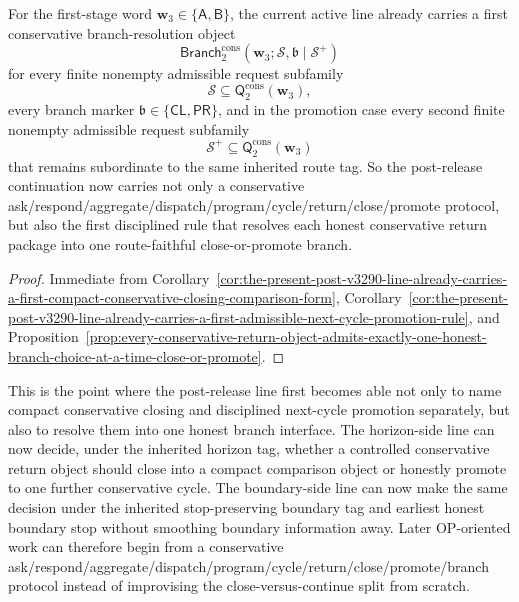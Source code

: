 \begin{corollary}
\label{cor:the-present-post-v3290-line-already-carries-a-first-conservative-branch-resolution-rule}
For the first-stage word \(\mathbf w_3\in\{\mathsf A,\mathsf B\}\), the current active line already carries a first conservative branch-resolution object
\[
  \mathsf{Branch}^{\mathrm{cons}}_{2}(\mathbf w_3;\mathcal S,\mathfrak b\mid\mathcal S^{+})
\]
for every finite nonempty admissible request subfamily
\[
  \mathcal S\subseteq \mathsf{Q}^{\mathrm{cons}}_{2}(\mathbf w_3),
\]
every branch marker \(\mathfrak b\in\{\mathsf{CL},\mathsf{PR}\}\), and in the promotion case every second finite nonempty admissible request subfamily
\[
  \mathcal S^{+}\subseteq \mathsf{Q}^{\mathrm{cons}}_{2}(\mathbf w_3)
\]
that remains subordinate to the same inherited route tag. So the post-release continuation now carries not only a conservative ask/respond/aggregate/dispatch/program/cycle/return/close/promote protocol, but also the first disciplined rule that resolves each honest conservative return package into one route-faithful close-or-promote branch.
\end{corollary}

\begin{proof}
Immediate from Corollary~\ref{cor:the-present-post-v3290-line-already-carries-a-first-compact-conservative-closing-comparison-form}, Corollary~\ref{cor:the-present-post-v3290-line-already-carries-a-first-admissible-next-cycle-promotion-rule}, and Proposition~\ref{prop:every-conservative-return-object-admits-exactly-one-honest-branch-choice-at-a-time-close-or-promote}.
\end{proof}

\begin{remark}
\label{rem:what-the-first-conservative-branch-resolution-rule-now-buys}
This is the point where the post-release line first becomes able not only to name compact conservative closing and disciplined next-cycle promotion separately, but also to resolve them into one honest branch interface. The horizon-side line can now decide, under the inherited horizon tag, whether a controlled conservative return object should close into a compact comparison object or honestly promote to one further conservative cycle. The boundary-side line can now make the same decision under the inherited stop-preserving boundary tag and earliest honest boundary stop without smoothing boundary information away. Later OP-oriented work can therefore begin from a conservative ask/respond/aggregate/dispatch/program/cycle/return/close/promote/branch protocol instead of improvising the close-versus-continue split from scratch.
\end{remark}



